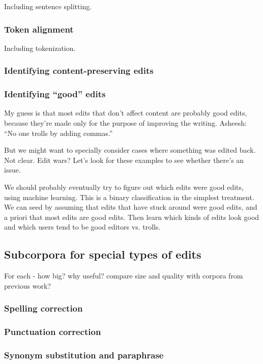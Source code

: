 \documentclass[11pt]{article}
\begin{document}
Including sentence splitting.

\subsubsection{Token alignment}

Including tokenization.

\subsubsection{Identifying content-preserving edits}

\subsubsection{Identifying ``good'' edits}

My guess is that most edits that don't affect content are probably
good edits, because they're made only for the purpose of improving the
writing.  Asheesh: ``No one trolls by adding commas.''

But we might want to specially consider cases where something was
edited back.  Not clear.  Edit wars?  Let's look for these examples to
see whether there's an issue.

We should probably eventually try to figure out which edits were good
edits, using machine learning.  This is a binary classification in the
simplest treatment.  We can seed by assuming that edits that have
stuck around were good edits, and a priori that most edits are good
edits.  Then learn which kinds of edits look good and which users tend
to be good editors vs. trolls.  

\subsection{Subcorpora for special types of edits}

For each - how big?  why useful?  compare size and quality with
corpora from previous work?

\subsubsection{Spelling correction}

\subsubsection{Punctuation correction}

\subsubsection{Synonym substitution and paraphrase}
\end{document}
